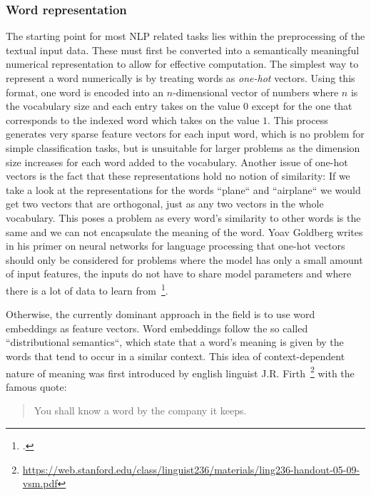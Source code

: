 \subsubsection{Word representation}
\label{sub:word_representation}

The starting point for most NLP related tasks lies within the preprocessing of the textual input data. These must first be converted into a semantically meaningful numerical representation to allow for effective computation. The simplest way to represent a word numerically is by treating words as \textit{one-hot} vectors. Using this format, one word is encoded into an $ n $-dimensional vector of numbers where $ n $ is the vocabulary size and each entry takes on the value $ 0 $ except for the one that corresponds to the indexed word which takes on the value $ 1 $. This process generates very sparse feature vectors for each input word, which is no problem for simple classification tasks, but is unsuitable for larger problems as the dimension size increases for each word added to the vocabulary. Another issue of one-hot vectors is the fact that these representations hold no notion of similarity: If we take a look at the representations for the words “plane“ and “airplane“ we would get two vectors that are orthogonal, just as any two vectors in the whole vocabulary. This poses a problem as every word's similarity to other words is the same and we can not encapsulate the meaning of the word. Yoav Goldberg writes in his primer on neural networks for language processing that one-hot vectors should only be considered for problems where the model has only a small amount of input features, the inputs do not have to share model parameters and where there is a lot of data to learn from~\footcite{DBLP:journals/corr/Goldberg15c}.

Otherwise, the currently dominant approach in the field is to use word embeddings as feature vectors. Word embeddings follow the so called “distributional semantics“, which state that a word's meaning is given by the words that tend to occur in a similar context. This idea of context-dependent nature of meaning was first introduced by english linguist J.R. Firth~\footnote{\url{https://web.stanford.edu/class/linguist236/materials/ling236-handout-05-09-vsm.pdf}} with the famous quote:

\begin{quote}
  You shall know a word by the company it keeps.
\end{quote}

